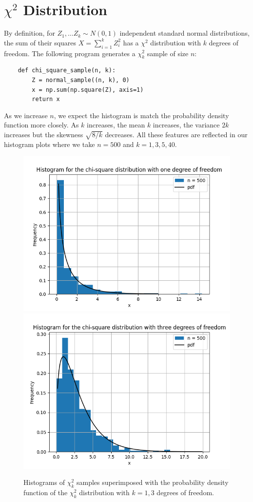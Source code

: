 \documentclass{article}
\begin{document}
\section{\(\chi^2\) Distribution}

By definition, for \(Z_1, \dots Z_k \sim N(0,1)\) independent standard normal distributions, the sum of their squares \(X = \sum_{i=1}^k Z^2_i\) has a \(\chi^2\) distribution with \(k\) degrees of freedom. The following program generates a \(\chi^2_k\) sample of size \(n\):

\begin{verbatim}
    def chi_square_sample(n, k):
        Z = normal_sample((n, k), 0) 
        x = np.sum(np.square(Z), axis=1)
        return x
\end{verbatim}

As we increase \(n\), we expect the histogram is match the probability density function more closely. As \(k\) increases, the mean \(k\) increases, the variance \(2k\) increases but the skewness \(\sqrt{8/k}\) decreases. All these features are reflected in our histogram plots where we take \(n = 500\) and \(k = 1, 3, 5, 40\).

\begin{figure}
    \centering
    \includegraphics[width=0.49\linewidth]{images/chi_square_500_1.png}
    \includegraphics[width=0.49\linewidth]{images/chi_square_500_3.png}
    \caption{Histograms of \(\chi^2_k\) samples superimposed with the probability density function of the \(\chi^2_k\) distribution with \(k = 1, 3\) degrees of freedom.}
\end{figure}
\end{document}
